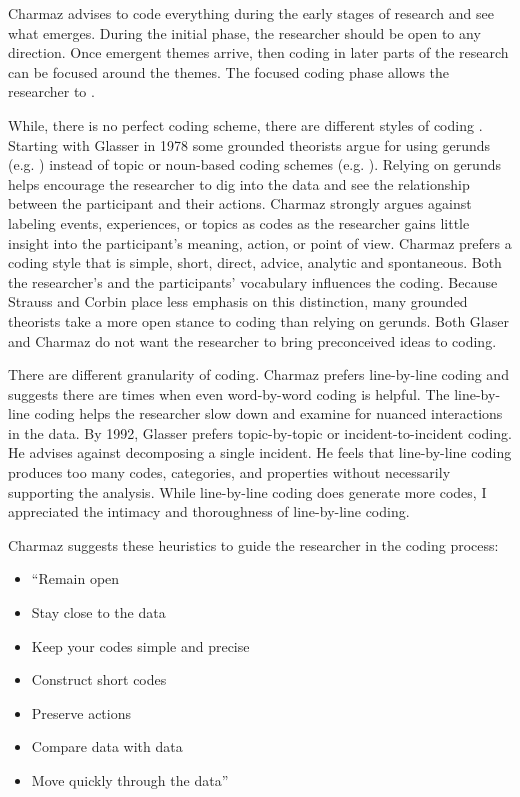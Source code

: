 Charmaz advises to code everything during the early stages of research and see what emerges. During the initial phase, the researcher should be open to any direction. Once emergent themes arrive, then coding in later parts of the research can be focused around the themes. The focused coding phase allows the researcher to  \cite{Charmaz}.

While, there is no perfect coding scheme,  there are different styles of coding \cite{Saldana2012}. Starting with Glasser in 1978 \cite{GlaserTheoreticalSensitivity} some grounded theorists argue for using gerunds (e.g.  ) instead of topic or noun-based coding schemes (e.g.  ). Relying on gerunds helps encourage the researcher to dig into the data and see the relationship between the participant and their actions. Charmaz strongly argues against labeling events, experiences, or topics as codes as the researcher gains little insight into the participant's meaning, action, or point of view. Charmaz prefers a coding style that is simple, short, direct, advice, analytic and spontaneous. Both the researcher's and the participants' vocabulary influences the coding. Because Strauss and Corbin \cite{Strauss1988Basics} place less emphasis on this distinction, many grounded theorists take a more open stance to coding than relying on gerunds. Both Glaser and Charmaz do not want the researcher to bring preconceived ideas to coding.

There are different granularity of coding. Charmaz prefers line-by-line coding and suggests there are times when even word-by-word coding is helpful. The line-by-line coding helps the researcher slow down and examine for nuanced interactions in the data. By 1992, Glasser prefers topic-by-topic or incident-to-incident coding. He advises against decomposing a single incident. He feels that line-by-line coding produces too many codes, categories, and properties without necessarily supporting the analysis. While line-by-line coding does generate more codes, I appreciated the intimacy and thoroughness of line-by-line coding.

Charmaz suggests these heuristics to guide the researcher in the coding process:
\begin{itemize}
\item ``Remain open
\item Stay close to the data
\item Keep your codes simple and precise
\item Construct short codes
\item Preserve actions
\item Compare data with data
\item Move quickly through the data'' \cite{Charmaz}
\end{itemize}

